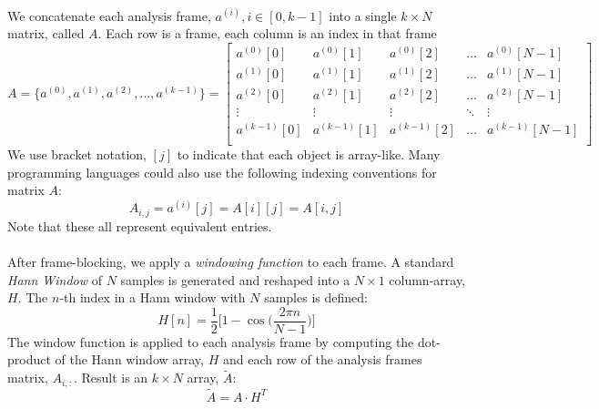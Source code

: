 \documentclass[12pt,letterpaper]{article}
\begin{document}
\paragraph*{}We concatenate each analysis frame, $a^{(i)}, i \in [0,k-1]$ into a single $k \times N$ matrix, called $A$. Each row is a frame, each column is an index in that frame
\begin{equation}
\label{eqn-FrameMatrix}
A = \big\{ a^{(0)} , a^{(1)} , a^{(2)} , ... , a^{(k-1)} \big\} = 
\begin{bmatrix}
a^{(0)}[0] & a^{(0)}[1] & a^{(0)}[2] & \hdots & a^{(0)}[N-1] \\
a^{(1)}[0] & a^{(1)}[1] & a^{(1)}[2] & \hdots & a^{(1)}[N-1] \\
a^{(2)}[0] & a^{(2)}[1] & a^{(2)}[2] & \hdots & a^{(2)}[N-1] \\
\vdots 		& \vdots 	  & \vdots 		& \ddots & \vdots        \\
a^{(k-1)}[0] & a^{(k-1)}[1] & a^{(k-1)}[2] & \hdots & a^{(k-1)}[N-1] \\
\end{bmatrix}
\end{equation}
We use bracket notation, $[j]$ to indicate that each object is array-like. Many programming languages could also use the following indexing conventions for matrix 
$A$:
\begin{equation}
\label{eqn-Indexing}
A_{i,j} = a^{(i)}[j] = A[i][j] = A[i,j]
\end{equation}
Note that these all represent equivalent entries.

\paragraph*{}After frame-blocking, we apply a \textit{windowing function} to each frame. A standard \textit{Hann Window} of $N$ samples is generated and reshaped into a $N \times 1$ column-array,$H$. The $n$-th index in a Hann window with $N$ samples is defined:
\begin{equation}
\label{eqn-Hann}
H[n] = \frac{1}{2}\bigg[ 1 - \cos\Big( \frac{2\pi n}{N-1}\Big)\bigg]
\end{equation}
The window function is applied to each analysis frame by computing the dot-product of the Hann window array, $H$ and each row of the analysis frames matrix, $A_{i,:}$. Result is an $k \times N$ array, $\widetilde{A}$:
\begin{equation}
\label{eqn-WindowMatrix}
\widetilde{A} = A \cdot H^T
\end{equation}
\end{document}
